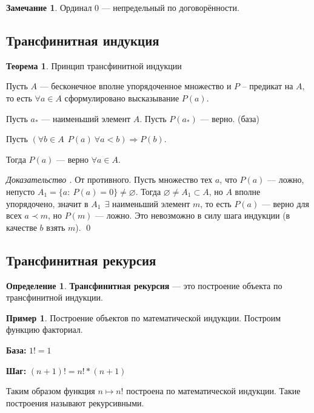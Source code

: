 \documentclass[12pt,oneside]{article}
\theoremstyle{definition}
\newtheorem{definition}{Определение}
\newtheorem{exmp}{Пример}[section]
\newtheorem{theorem}{Теорема}[section]
\newtheorem{remark}{Замечание}[section]
\newenvironment{ourproof}[1]{\textit{Доказательство #1.}}{\qed}
\begin{document}
\begin{remark}
Ординал $0$ --- непредельный по договорённости.
\end{remark}

\subsection{Трансфинитная индукция}

\begin{theorem}{Принцип трансфинитной индукции}\label{transfinit}

Пусть $A$ --- бесконечное вполне упорядоченное множество и $P$ -- предикат на $A$, то есть $\forall a\in A$ сформулировано высказывание $P(a)$.

Пусть $a_*$ --- наименьший элемент $A$. Пусть $P(a_*)$ --- верно. (база)

Пусть $(\forall b\in A\ \ P(a)\ \forall a < b) \Longrightarrow P(b)$.

Тогда $P(a)$ --- верно $\forall a\in A$.

\begin{ourproof}{}
От противного. Пусть множество тех $a$, что $P(a)$ --- ложно, непусто $A_1 = \{a:\ P(a)=0\}\neq\varnothing$. Тогда $\varnothing\neq A_1\subset A$, но $A$ вполне упорядочено, значит в $A_1\ \ \exists$ наименьший элемент $m$, то есть  $P(a)$ --- верно для всех $a\prec m$, но $P(m)$ --- ложно. Это невозможно в силу шага индукции (в качестве $b$ взять $m$). 
\end{ourproof}
\end{theorem}

\subsection{Трансфинитная рекурсия}

\begin{definition}
\textbf{Трансфинитная рекурсия } --- это построение объекта по трансфинитной индукции.
\end{definition}

\begin{exmp}
 Построение объектов по математической индукции. Построим функцию факториал.

\textbf{База: } $1! = 1$

\textbf{Шаг: } $(n+1)! = n!*(n+1)$

Таким образом функция $n \longmapsto n!$ построена по математической индукции. Такие построения называют рекурсивными.
\end{exmp}
\end{document}
